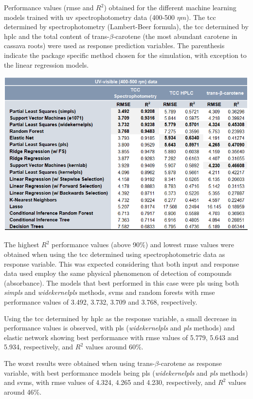 \begin{table}[h]
	\centering
	\caption{Performance values (\gls{rmse} and $R^{2}$) obtained for the different machine learning models trained with \gls{uv} spectrophotometry data (400-500 $\eta m$). The \acrfull{tcc} determined by spectrophotometry (Lambert-Beer formula), the \gls{tcc} determined by \gls{hplc} and the total content of trans-$\beta$-carotene (the most abundant carotene in cassava roots) were used as response prediction variables. The parenthesis indicate the package specific method chosen for the simulation, with exception to the linear regression models.}	
	\includegraphics[width=1\linewidth]{Imagens/Case_study/UV_table}
	\label{UV_table}
\end{table}


The highest $R^{2}$ performance values (above 90\%) and lowest \gls{rmse} values were obtained when using the \gls{tcc} determined using spectrophotometric data as response variable. This was expected considering that both input and response data used employ the same physical phenomenon of detection of compounds (absorbance). The models that best performed in this case were \gls{pls} using both \textit{simpls} and \textit{widekernelpls} methods, \gls{svm}s and random forests with \gls{rmse} performance values of 3.492, 3.732, 3.709 and 3.768, respectively.

Using the \gls{tcc} determined by \gls{hplc} as the response variable, a small decrease in performance values is observed, with \gls{pls} (\textit{widekernelpls} and \textit{pls} methods) and elastic network showing best performance with \gls{rmse} values of 5.779, 5.643 and 5.934, respectively, and $R^{2}$ values around 60\%.

The worst results were obtained when using trans-$\beta$-carotene as response variable, with best performance models being \gls{pls} (\textit{widekernelpls} and \textit{pls} methods) and \gls{svm}s, with \gls{rmse} values of 4.324, 4.265 and 4.230, respectively, and $R^{2}$ values around 46\%.

